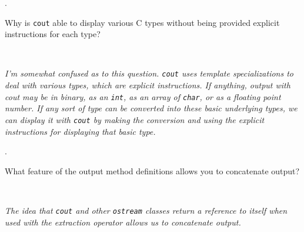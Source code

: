 \documentclass{amsart}
\newcommand{\ttt}[1]{\texttt{#1}}
\begin{document}
. 
\begin{minipage}[t]{11.5 cm}
	Why is \texttt{cout} able to display various C\raisebox{.15ex}{++} types without being provided explicit instructions for each type?
\end{minipage} \\[1ex]
\phantom{2. } 
\begin{minipage}[t]{11.5 cm}
	{\slshape 
		I'm somewhat confused as to this question.
		\ttt{cout} uses template specializations to deal with 
		various types, which are explicit instructions.
		If anything, output with cout may be in binary, 
		as an \ttt{int}, as an array of \ttt{char}, or as a floating
		point number.
		If any sort of type can be converted into these
		basic underlying types, we can display it with \ttt{cout}
		by making the conversion and using the explicit
		instructions for displaying that basic type.
	} 
\end{minipage} 
\vfill

. 
\begin{minipage}[t]{11.5 cm}
	What feature of the output method definitions allows you to concatenate output?
\end{minipage} \\[1ex]
\phantom{3. } 
\begin{minipage}[t]{11.5 cm}
	{\slshape 
		The idea that \ttt{cout} and other \ttt{ostream} classes
		return a reference to itself when used with the extraction
		operator allows us to concatenate output.
	} 
\end{minipage} 
\newpage
\end{document}
